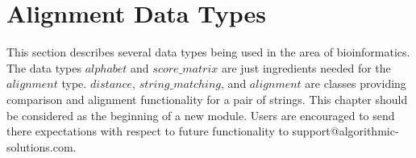 
\chapter{Alignment Data Types} 
\label{AlignmentTypes}\label{Alignment}

This section describes several data types being used in the area of bioinformatics.
The data types $alphabet$ and $score\_matrix$ are just ingredients needed for the $alignment$
type. $distance$, $string\_matching$, and $alignment$ are classes providing comparison and
alignment functionality for a pair of strings. This chapter should be considered as the beginning
of a new module. Users are encouraged to send there expectations with respect to future functionality
to support@algorithmic-solutions.com.


\newpage

\newpage

\newpage

\newpage

\newpage

